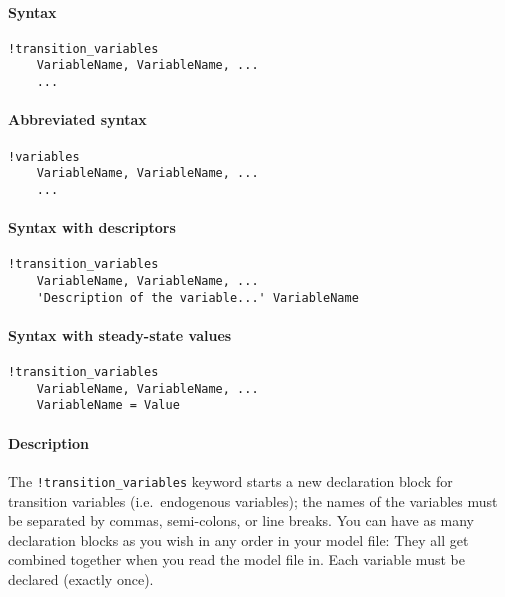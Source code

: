 


	\paragraph{Syntax}\label{syntax}

\begin{verbatim}
!transition_variables
    VariableName, VariableName, ...
    ...
\end{verbatim}

\paragraph{Abbreviated syntax}\label{abbreviated-syntax}

\begin{verbatim}
!variables
    VariableName, VariableName, ...
    ...
\end{verbatim}

\paragraph{Syntax with descriptors}\label{syntax-with-descriptors}

\begin{verbatim}
!transition_variables
    VariableName, VariableName, ...
    'Description of the variable...' VariableName
\end{verbatim}

\paragraph{Syntax with steady-state
values}\label{syntax-with-steady-state-values}

\begin{verbatim}
!transition_variables
    VariableName, VariableName, ...
    VariableName = Value
\end{verbatim}

\paragraph{Description}\label{description}

The \texttt{!transition\_variables} keyword starts a new declaration
block for transition variables (i.e.~endogenous variables); the names of
the variables must be separated by commas, semi-colons, or line breaks.
You can have as many declaration blocks as you wish in any order in your
model file: They all get combined together when you read the model file
in. Each variable must be declared (exactly once).

